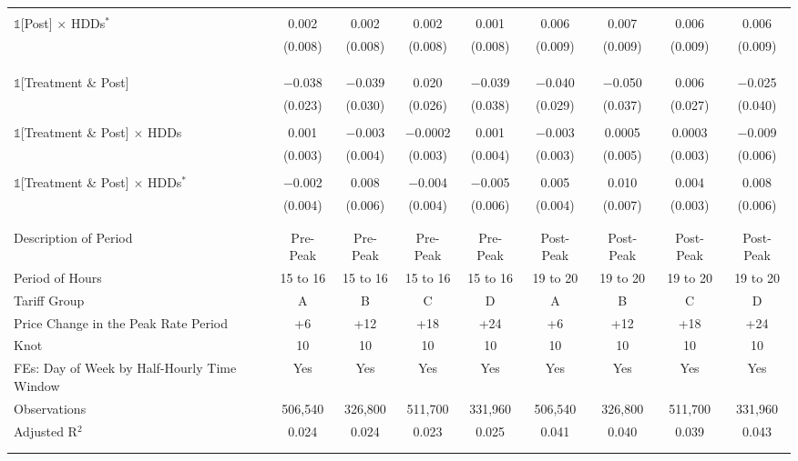 \begin{ThreePartTable}
\begin{landscape}
\begin{longtable}{@{\extracolsep{1.5pt}}lcccccccc}
            & & & & & & & & \\
            $\mathbb{1}$[Post] $\times$ HDDs$^{*}$ & 0.002 & 0.002 & 0.002 & 0.001 & 0.006 & 0.007 & 0.006 & 0.006 \\
            & (0.008) & (0.008) & (0.008) & (0.008) & (0.009) & (0.009) & (0.009) & (0.009) \\
            & & & & & & & & \\
            & & & & & & & & \\
            & & & & & & & & \\
            $\mathbb{1}$[Treatment \& Post] & $-$0.038 & $-$0.039 & 0.020 & $-$0.039 & $-$0.040 & $-$0.050 & 0.006 & $-$0.025 \\
            & (0.023) & (0.030) & (0.026) & (0.038) & (0.029) & (0.037) & (0.027) & (0.040) \\
            & & & & & & & & \\
            $\mathbb{1}$[Treatment \& Post] $\times$ HDDs & 0.001 & $-$0.003 & $-$0.0002 & 0.001 & $-$0.003 & 0.0005 & 0.0003 & $-$0.009 \\
            & (0.003) & (0.004) & (0.003) & (0.004) & (0.003) & (0.005) & (0.003) & (0.006) \\
            & & & & & & & & \\
            $\mathbb{1}$[Treatment \& Post] $\times$ HDDs$^{*}$ & $-$0.002 & 0.008 & $-$0.004 & $-$0.005 & 0.005 & 0.010 & 0.004 & 0.008 \\
            & (0.004) & (0.006) & (0.004) & (0.006) & (0.004) & (0.007) & (0.003) & (0.006) \\
            & & & \\
            \hline
            \\[-2.0ex]
            Description of Period & Pre-Peak & Pre-Peak & Pre-Peak & Pre-Peak & Post-Peak & Post-Peak & Post-Peak & Post-Peak \\
            Period of Hours & 15 to 16 & 15 to 16 & 15 to 16 & 15 to 16 & 19 to 20 & 19 to 20 & 19 to 20 & 19 to 20 \\
            Tariff Group & A & B & C & D & A & B & C & D \\
            Price Change in the Peak Rate Period & +6 & +12 & +18 & +24 & +6 & +12 & +18 & +24 \\
            Knot & 10 & 10 & 10 & 10 & 10 & 10 & 10 & 10 \\
            FEs: Day of Week by Half-Hourly Time Window & Yes & Yes & Yes & Yes & Yes & Yes & Yes & Yes \\
            Observations & 506,540 & 326,800 & 511,700 & 331,960 & 506,540 & 326,800 & 511,700 & 331,960 \\
            Adjusted R$^{2}$ & 0.024 & 0.024 & 0.023 & 0.025 & 0.041 & 0.040 & 0.039 & 0.043 \\
            \\[-2.0ex]
            \hline \hline
            \\[-4.5ex]


\end{longtable}
\end{landscape}
\end{ThreePartTable}
